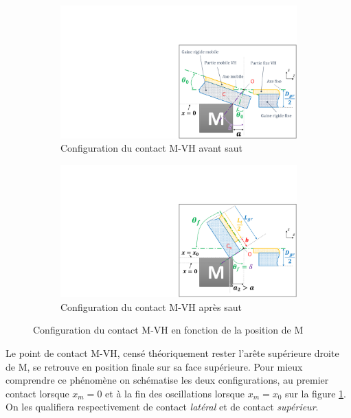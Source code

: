 \begin{figure}[!htbp]
	\begin{center}
		\begin{subfigure}[b]{0.49\textwidth}
			\captionsetup{justification=centering}
			\includegraphics[trim={16.8cm 0cm 0cm 5.5cm},clip,width=\textwidth]{../Chap6/Figure/cinematique_pliage_VH_lacher_mini.pdf}
			\caption{Configuration du contact M-VH avant saut}
			\label{fig:cinematique_VH_avant-saut_mini}
		\end{subfigure}
		\hfillx
		\begin{subfigure}[b]{0.49\textwidth}
			\captionsetup{justification=centering}
			\includegraphics[trim={16.8cm 0cm 0cm 5.5cm},clip,width=\textwidth]{../Chap6/Figure/cinematique_pliage_VH_lacher_mini_saut.pdf}
			\caption{Configuration du contact M-VH après saut}
			\label{fig:cinematique_VH_après-saut_mini}
		\end{subfigure}
		\caption{Configuration du contact M-VH en fonction de la position de M}
		\label{fig:cinematique_VH_mini}
	\end{center}
\end{figure}
Le point de contact M-VH, censé théoriquement rester l'arête supérieure droite de M, se retrouve en position finale sur sa face supérieure. Pour mieux comprendre ce phénomène on schématise les deux configurations, au premier contact lorsque $x_m=0$ et à la fin des oscillations lorsque $x_m=x_0$ sur la figure \ref{fig:cinematique_VH_avant-saut_mini}. On les qualifiera respectivement de contact \emph{latéral} et de contact \emph{supérieur}.

